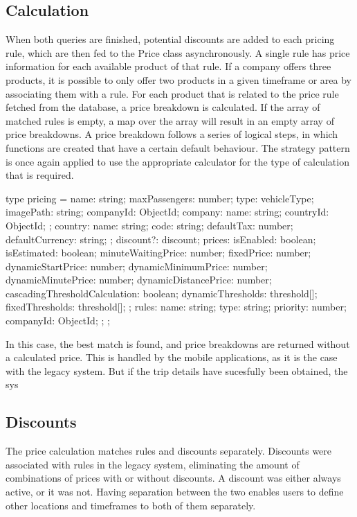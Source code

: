 \subsection{Calculation}
When both queries are finished, potential discounts are added to each pricing rule, which are then fed to the Price class asynchronously. A single rule has price information for each available product of that rule. If a company offers three products, it is possible to only offer two products in a given timeframe or area by associating them with a rule. For each product that is related to the price rule fetched from the database, a price breakdown is calculated. If the array of matched rules is empty, a map over the array will result in an empty array of price breakdowns. A price breakdown follows a series of logical steps, in which functions are created that have a certain default behaviour. The strategy pattern is once again applied to use the appropriate calculator for the type of calculation that is required.

type pricing = {
  name: string;
  maxPassengers: number;
  type: vehicleType;
  imagePath: string;
  companyId: ObjectId;
  company: {
    name: string;
    countryId: ObjectId;
  };
  country: {
    name: string;
    code: string;
    defaultTax: number;
    defaultCurrency: string;
  };
  discount?: discount;
  prices: {
    isEnabled: boolean;
    isEstimated: boolean;
    minuteWaitingPrice: number;
    fixedPrice: number;
    dynamicStartPrice: number;
    dynamicMinimumPrice: number;
    dynamicMinutePrice: number;
    dynamicDistancePrice: number;
    cascadingThresholdCalculation: boolean;
    dynamicThresholds: threshold[];
    fixedThresholds: threshold[];
  };
  rules: {
    name: string;
    type: string;
    priority: number;
    companyId: ObjectId;
  };
};


In this case, the best match is found, and price breakdowns are returned without a calculated price. This is handled by the mobile applications, as it is the case with the legacy system. But if the trip details have sucesfully been obtained, the sys

\subsection{Discounts}
The price calculation matches rules and discounts separately. Discounts were associated with rules in the legacy system, eliminating the amount of combinations of prices with or without discounts. A discount was either always active, or it was not. Having separation between the two enables users to define other locations and timeframes to both of them separately.

